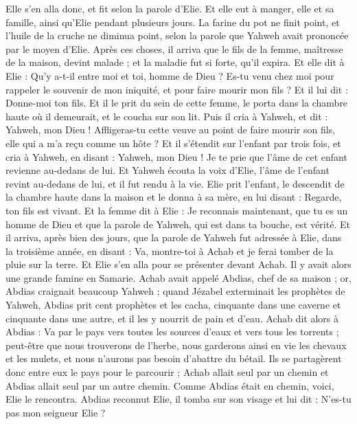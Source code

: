 \begin{multicols}{2}
Elle s'en alla donc, et fit selon la parole d'Elie. Et elle eut à manger, elle et sa famille, ainsi qu’Elie pendant plusieurs jours.
La farine du pot ne finit point, et l'huile de la cruche ne diminua point, selon la parole que Yahweh avait prononcée par le moyen d'Elie.
Après ces choses, il arriva que le fils de la femme, maîtresse de la maison, devint malade ; et la maladie fut si forte, qu'il expira.
Et elle dit à Elie : Qu'y a-t-il entre moi et toi, homme de Dieu ? Es-tu venu chez moi pour rappeler le souvenir de mon iniquité, et pour faire mourir mon fils ?
Et il lui dit : Donne-moi ton fils. Et il le prit du sein de cette femme, le porta dans la chambre haute où il demeurait, et le coucha sur son lit.
Puis il cria à Yahweh, et dit : Yahweh, mon Dieu ! Affligeras-tu cette veuve au point de faire mourir son fils, elle qui a m’a reçu comme un hôte ?
Et il s'étendit sur l'enfant par trois fois, et cria à Yahweh, en disant : Yahweh, mon Dieu ! Je te prie que l'âme de cet enfant revienne au-dedans de lui.
Et Yahweh écouta la voix d'Elie, l'âme de l'enfant revint au-dedans de lui, et il fut rendu à la vie.
Elie prit l'enfant, le descendit de la chambre haute dans la maison et le donna à sa mère, en lui disant : Regarde, ton fils est vivant.
Et la femme dit à Elie : Je reconnais maintenant, que tu es un homme de Dieu et que la parole de Yahweh, qui est dans ta bouche, est vérité.
\VerseOne{}Et il arriva, après bien des jours, que la parole de Yahweh fut adressée à Elie, dans la troisième année, en disant : Va, montre-toi à Achab et je ferai tomber de la pluie sur la terre.
Et Elie s'en alla pour se présenter devant Achab. Il y avait alors une grande famine en Samarie.
Achab avait appelé Abdias, chef de sa maison ; or, Abdias craignait beaucoup Yahweh ;
quand Jézabel exterminait les prophètes de Yahweh, Abdias prit cent prophètes et les cacha, cinquante dans une caverne et cinquante dans une autre, et il les y nourrit de pain et d'eau.
Achab dit alors à Abdias : Va par le pays vers toutes les sources d'eaux et vers tous les torrents ; peut-être que nous trouverons de l'herbe, nous garderons ainsi en vie les chevaux et les mulets, et nous n’aurons pas besoin d’abattre du bétail.
Ils se partagèrent donc entre eux le pays pour le parcourir ; Achab allait seul par un chemin et Abdias allait seul par un autre chemin.
Comme Abdias était en chemin, voici, Elie le rencontra. Abdias reconnut Elie, il tomba sur son visage et lui dit : N'es-tu pas mon seigneur Elie ?

\end{multicols}
